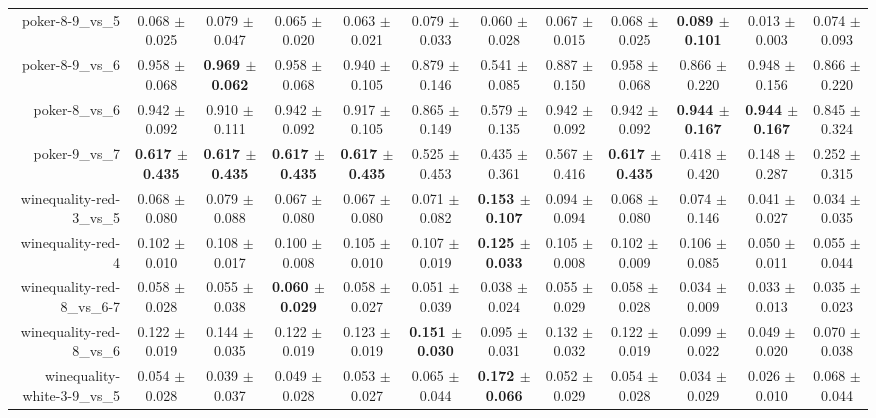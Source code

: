 \begin{table}[!ht]
{\begin{tabular}{r c c c c c c c c c c c}
poker-8-9\_vs\_5 & 0.068 $\pm$ 0.025 & 0.079 $\pm$ 0.047 & 0.065 $\pm$ 0.020 & 0.063 $\pm$ 0.021 & 0.079 $\pm$ 0.033 & 0.060 $\pm$ 0.028 & 0.067 $\pm$ 0.015 & 0.068 $\pm$ 0.025 & \textbf{0.089 $\pm$ 0.101} & 0.013 $\pm$ 0.003 & 0.074 $\pm$ 0.093 \\
poker-8-9\_vs\_6 & 0.958 $\pm$ 0.068 & \textbf{0.969 $\pm$ 0.062} & 0.958 $\pm$ 0.068 & 0.940 $\pm$ 0.105 & 0.879 $\pm$ 0.146 & 0.541 $\pm$ 0.085 & 0.887 $\pm$ 0.150 & 0.958 $\pm$ 0.068 & 0.866 $\pm$ 0.220 & 0.948 $\pm$ 0.156 & 0.866 $\pm$ 0.220 \\
poker-8\_vs\_6 & 0.942 $\pm$ 0.092 & 0.910 $\pm$ 0.111 & 0.942 $\pm$ 0.092 & 0.917 $\pm$ 0.105 & 0.865 $\pm$ 0.149 & 0.579 $\pm$ 0.135 & 0.942 $\pm$ 0.092 & 0.942 $\pm$ 0.092 & \textbf{0.944 $\pm$ 0.167} & \textbf{0.944 $\pm$ 0.167} & 0.845 $\pm$ 0.324 \\
poker-9\_vs\_7 & \textbf{0.617 $\pm$ 0.435} & \textbf{0.617 $\pm$ 0.435} & \textbf{0.617 $\pm$ 0.435} & \textbf{0.617 $\pm$ 0.435} & 0.525 $\pm$ 0.453 & 0.435 $\pm$ 0.361 & 0.567 $\pm$ 0.416 & \textbf{0.617 $\pm$ 0.435} & 0.418 $\pm$ 0.420 & 0.148 $\pm$ 0.287 & 0.252 $\pm$ 0.315 \\
winequality-red-3\_vs\_5 & 0.068 $\pm$ 0.080 & 0.079 $\pm$ 0.088 & 0.067 $\pm$ 0.080 & 0.067 $\pm$ 0.080 & 0.071 $\pm$ 0.082 & \textbf{0.153 $\pm$ 0.107} & 0.094 $\pm$ 0.094 & 0.068 $\pm$ 0.080 & 0.074 $\pm$ 0.146 & 0.041 $\pm$ 0.027 & 0.034 $\pm$ 0.035 \\
winequality-red-4 & 0.102 $\pm$ 0.010 & 0.108 $\pm$ 0.017 & 0.100 $\pm$ 0.008 & 0.105 $\pm$ 0.010 & 0.107 $\pm$ 0.019 & \textbf{0.125 $\pm$ 0.033} & 0.105 $\pm$ 0.008 & 0.102 $\pm$ 0.009 & 0.106 $\pm$ 0.085 & 0.050 $\pm$ 0.011 & 0.055 $\pm$ 0.044 \\
winequality-red-8\_vs\_6-7 & 0.058 $\pm$ 0.028 & 0.055 $\pm$ 0.038 & \textbf{0.060 $\pm$ 0.029} & 0.058 $\pm$ 0.027 & 0.051 $\pm$ 0.039 & 0.038 $\pm$ 0.024 & 0.055 $\pm$ 0.029 & 0.058 $\pm$ 0.028 & 0.034 $\pm$ 0.009 & 0.033 $\pm$ 0.013 & 0.035 $\pm$ 0.023 \\
winequality-red-8\_vs\_6 & 0.122 $\pm$ 0.019 & 0.144 $\pm$ 0.035 & 0.122 $\pm$ 0.019 & 0.123 $\pm$ 0.019 & \textbf{0.151 $\pm$ 0.030} & 0.095 $\pm$ 0.031 & 0.132 $\pm$ 0.032 & 0.122 $\pm$ 0.019 & 0.099 $\pm$ 0.022 & 0.049 $\pm$ 0.020 & 0.070 $\pm$ 0.038 \\
winequality-white-3-9\_vs\_5 & 0.054 $\pm$ 0.028 & 0.039 $\pm$ 0.037 & 0.049 $\pm$ 0.028 & 0.053 $\pm$ 0.027 & 0.065 $\pm$ 0.044 & \textbf{0.172 $\pm$ 0.066} & 0.052 $\pm$ 0.029 & 0.054 $\pm$ 0.028 & 0.034 $\pm$ 0.029 & 0.026 $\pm$ 0.010 & 0.068 $\pm$ 0.044 \\

\end{tabular}}
\end{table}
